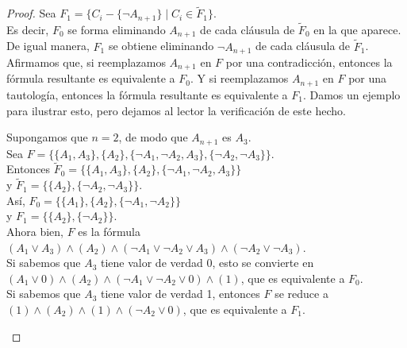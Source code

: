 \documentclass[12pt,a4paper]{book}
\begin{document}
\begin{proof}
        Sea $F_{1}=\{C_{i}-\{\neg A_{n+1}\}\mid C_{i}\in\widetilde{F}_{1}\}$.\\
        Es decir, $F_{0}$ se forma eliminando $A_{n+1}$ de cada cláusula de $\widetilde{F}_{0}$ en la que aparece. De igual
        manera, $F_{1}$ se obtiene eliminando $\neg A_{n+1}$ de cada cláusula de $\widetilde{F}_{1}$.\\
        Afirmamos que, si reemplazamos $A_{n+1}$ en $F$ por una contradicción, entonces la fórmula resultante es equivalente
        a $F_{0}$. Y si reemplazamos $A_{n+1}$ en $F$ por una tautología, entonces la fórmula resultante es equivalente a
        $F_{1}$. Damos un ejemplo para ilustrar esto, pero dejamos al lector la verificación de este hecho.

        \begin{ejemplo}\label{ej:reduccion-atomicas}
            Supongamos que $n=2$, de modo que $A_{n+1}$ es $A_{3}$.\\
            Sea $F=\{\{A_{1},A_{3}\},\{A_{2}\},\{\neg A_{1},\neg A_{2},A_{3}\},\{\neg A_{2},\neg A_{3}\}\}$.\\
            Entonces $\widetilde{F}_{0}=\{\{A_{1},A_{3}\},\{A_{2}\},\{\neg A_{1},\neg A_{2},A_{3}\}\}$\\
            y $\widetilde{F}_{1}=\{\{A_{2}\},\{\neg A_{2},\neg A_{3}\}\}$.\\
            Así, $F_{0}=\{\{A_{1}\},\{A_{2}\},\{\neg A_{1},\neg A_{2}\}\}$\\
            y $F_{1}=\{\{A_{2}\},\{\neg A_{2}\}\}$.\\
            Ahora bien, $F$ es la fórmula $(A_{1}\vee A_{3})\wedge(A_{2})\wedge(\neg A_{1}\vee\neg A_{2}\vee A_{3})\wedge(\neg A_{2}\vee\neg A_{3})$.\\
            Si sabemos que $A_{3}$ tiene valor de verdad 0, esto se convierte en
            $(A_{1}\vee 0)\wedge(A_{2})\wedge(\neg A_{1}\vee\neg A_{2}\vee 0)\wedge(1)$, que es equivalente a $F_{0}$.\\
            Si sabemos que $A_{3}$ tiene valor de verdad 1, entonces $F$ se reduce a
            $(1)\wedge(A_{2})\wedge(1)\wedge(\neg A_{2}\vee 0)$, que es equivalente a $F_{1}$.
        \end{ejemplo}


\end{proof}
\end{document}
